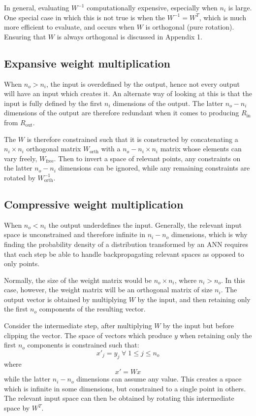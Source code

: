 \documentclass[../../main.tex]{subfiles}
\begin{document}
In general, evaluating $W^{-1}$ computationally expensive, especially when $n_i$ is large.
One special case in which this is not true is when the $W^{-1}=W^T$, which is much more efficient to evaluate, and occurs when $W$ is orthogonal (pure rotation).
Ensuring that $W$ is always orthogonal is discussed in Appendix 1.

\subsection{Expansive weight multiplication} \label{subsection:expansiveWeightMultiplication}

When $n_o>n_i$, the input is overdefined by the output, hence not every output will have an input which creates it.
An alternate way of looking at this is that the input is fully defined by the first $n_i$ dimensions of the output.
The latter $n_o-n_i$ dimensions of the output are therefore redundant when it comes to producing $R_\text{in}$ from $R_\text{out}$.

The $W$ is therefore constrained such that it is constructed by concatenating a $n_i\times n_i$ orthogonal matrix $W_\text{orth}$ with a $n_o-n_i\times n_i$ matrix whose elements can vary freely, $W_\text{free}$.
Then to invert a space of relevant points, any constraints on the latter $n_o-n_i$ dimensions can be ignored, while any remaining constraints are rotated by $W_\text{orth}^{-1}$.

\subsection{Compressive weight multiplication} \label{subsection:compressiveWeightMultiplication}

When $n_o<n_i$ the output underdefines the input.
Generally, the relevant input space is unconstrained and therefore infinite in $n_i-n_o$ dimensions, which is why finding the probability density of a distribution transformed by an ANN requires that each step be able to handle backpropagating relevant spaces as opposed to only points.

Normally, the size of the weight matrix would be $n_o\times n_i$, where $n_i>n_o$.
In this case, however, the weight matrix will be an orthogonal matrix of size $n_i$.
The output vector is obtained by multiplying $W$ by the input, and then retaining only the first $n_o$ components of the resulting vector.

Consider the intermediate step, after multiplying $W$ by the input but before clipping the vector.
The space of vectors which produce $y$ when retaining only the first $n_o$ components is constrained such that:
\begin{equation}
    x'_j=y_j\;\forall\;1\le j\le n_o
\end{equation}
where
\begin{equation}
    x'=Wx
\end{equation}
while the latter $n_i-n_o$ dimensions can assume any value.
This creates a space which is infinite in some dimensions, but constrained to a single point in others.
The relevant input space can then be obtained by rotating this intermediate space by $W^T$.
\end{document}
